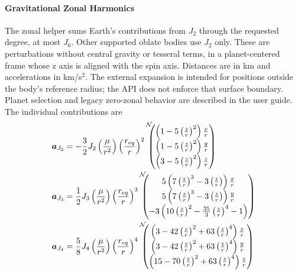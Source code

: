 \paragraph{Gravitational Zonal Harmonics}
The zonal helper sums Earth's contributions from $J_2$ through the requested degree, at most $J_6$. Other supported oblate bodies use $J_2$ only. These are perturbations without central gravity or tesseral terms, in a planet-centered frame whose z axis is aligned with the spin axis. Distances are in km and accelerations in km/s$^2$. The external expansion is intended for positions outside the body's reference radius; the API does not enforce that surface boundary. Planet selection and legacy zero-zonal behavior are described in the user guide. The individual contributions are\cite{schaub}
\begin{align}
	\bm a_{J_{2}} &=   -\frac{3}{2} J_{2}
	\left(\frac{\mu}{r^{2}}\right)
	\left( \frac{r_{eq}}{r}\right)^{2}
	\leftexp{N\!\!\!}{
	\begin{pmatrix}
		\left(1-5\left(\frac{z}{r}\right)^{2}\right) \frac{x}{r} \\
		\left(1-5\left(\frac{z}{r}\right)^{2}\right) \frac{y}{r} \\
		\left(3-5\left(\frac{z}{r}\right)^{2}\right) \frac{z}{r}
	\end{pmatrix}}
	\label{eq:gm:aJ2}
	\\
	\bm a_{J_{3}} &=  \frac{1}{2} J_{3}
	\left(\frac{\mu}{r^{2}}\right)
	\left( \frac{r_{eq}}{r}\right)^{3}
	\leftexp{N\!\!\!}{
	\begin{pmatrix}
		5\left(7 \left(\frac{z}{r}\right)^{3} - 3 \left(\frac{z}{r}\right)
		\right) \frac{x}{r} \\
		5\left(7 \left(\frac{z}{r}\right)^{3} - 3 \left(\frac{z}{r}\right)
		\right) \frac{y}{r} \\
		-3\left(10\left(\frac{z}{r}\right)^{2} - \frac{35}{3}
		\left(\frac{z}{r}\right)^{4} - 1 \right)
	\end{pmatrix}}
	\label{eq:gm:aJ3}
	\\
	\bm a_{J_{4}} &=  \frac{5}{8} J_{4}
	\left(\frac{\mu}{r^{2}}\right)
	\left( \frac{r_{eq}}{r}\right)^{4}
	\leftexp{N\!\!\!}{
	\begin{pmatrix}
		\left(3-42 \left(\frac{z}{r}\right)^{2} +63 \left(\frac{z}{r}\right)^{4}
		\right) \frac{x}{r} \\
		\left(3-42 \left(\frac{z}{r}\right)^{2} +63 \left(\frac{z}{r}\right)^{4}
		\right) \frac{y}{r} \\
		\left(15-70\left(\frac{z}{r}\right)^{2} + 63
		\left(\frac{z}{r}\right)^{4}  \right) \frac{z}{r}

\end{pmatrix}}
\end{align}
